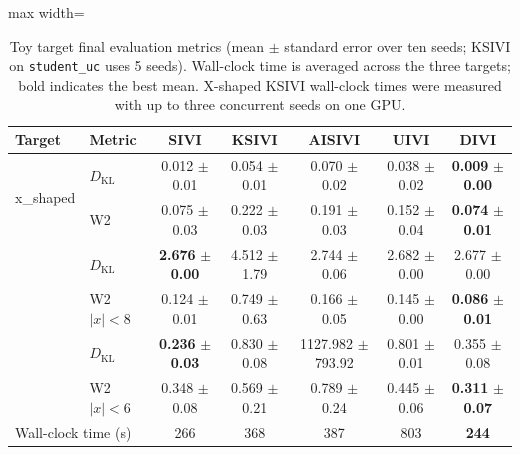 \begin{table}[t]
\centering
\caption{Toy target final evaluation metrics (mean $\pm$ standard error over ten seeds; KSIVI on \texttt{student\_uc} uses 5 seeds). Wall-clock time is averaged across the three targets; bold indicates the best mean. X-shaped KSIVI wall-clock times were measured with up to three concurrent seeds on one GPU.}
\label{tab:toy-method-grid}
\small
\setlength{\tabcolsep}{3pt}
\begin{adjustbox}{max width=\linewidth}
\begin{tabular}{llccccc}
\toprule
Target & Metric & SIVI & KSIVI & AISIVI & UIVI & DIVI \\
\midrule
\multirow{2}{*}{x\_shaped} & $D_{\mathrm{KL}}$ & 0.012 $\pm$ {\footnotesize 0.01} & 0.054 $\pm$ {\footnotesize 0.01} & 0.070 $\pm$ {\footnotesize 0.02} & 0.038 $\pm$ {\footnotesize 0.02} & \textbf{0.009} $\pm$ {\footnotesize \textbf{0.00}} \\
 & W2 & 0.075 $\pm$ {\footnotesize 0.03} & 0.222 $\pm$ {\footnotesize 0.03} & 0.191 $\pm$ {\footnotesize 0.03} & 0.152 $\pm$ {\footnotesize 0.04} & \textbf{0.074} $\pm$ {\footnotesize \textbf{0.01}} \\
\addlinespace[2pt]
\multirow{2}{*}{student\_uc} & $D_{\mathrm{KL}}$ & \textbf{2.676} $\pm$ {\footnotesize \textbf{0.00}} & 4.512 $\pm$ {\footnotesize 1.79} & 2.744 $\pm$ {\footnotesize 0.06} & 2.682 $\pm$ {\footnotesize 0.00} & 2.677 $\pm$ {\footnotesize 0.00} \\
 & W2 $|x|<8$ & 0.124 $\pm$ {\footnotesize 0.01} & 0.749 $\pm$ {\footnotesize 0.63} & 0.166 $\pm$ {\footnotesize 0.05} & 0.145 $\pm$ {\footnotesize 0.00} & \textbf{0.086} $\pm$ {\footnotesize \textbf{0.01}} \\
\addlinespace[2pt]
\multirow{2}{*}{8\_gaussians} & $D_{\mathrm{KL}}$ & \textbf{0.236} $\pm$ {\footnotesize \textbf{0.03}} & 0.830 $\pm$ {\footnotesize 0.08} & 1127.982 $\pm$ {\footnotesize 793.92} & 0.801 $\pm$ {\footnotesize 0.01} & 0.355 $\pm$ {\footnotesize 0.08} \\
 & W2 $|x|<6$ & 0.348 $\pm$ {\footnotesize 0.08} & 0.569 $\pm$ {\footnotesize 0.21} & 0.789 $\pm$ {\footnotesize 0.24} & 0.445 $\pm$ {\footnotesize 0.06} & \textbf{0.311} $\pm$ {\footnotesize \textbf{0.07}} \\
\midrule
\multicolumn{2}{l}{Wall-clock time (s)} & 266 & 368 & 387 & 803 & \textbf{244} \\
\bottomrule
\end{tabular}
\end{adjustbox}
\end{table}
